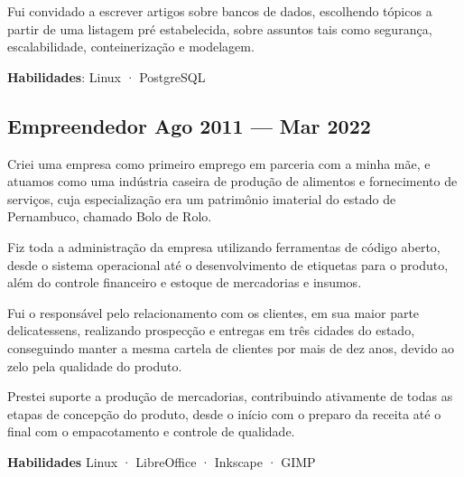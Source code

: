 \begin{zitemize}
  \item
    Fui convidado a escrever artigos sobre bancos de dados, escolhendo tópicos
    a partir de uma listagem pré estabelecida, sobre assuntos tais como
    segurança, escalabilidade, conteinerização e modelagem.
\end{zitemize}

\textbf{Habilidades}: Linux · PostgreSQL

\vspace{1em}
\subsection{Empreendedor \hfill Ago 2011 --- Mar 2022}

\begin{zitemize}
  \item
    Criei uma empresa como primeiro emprego em parceria com a minha mãe, e
    atuamos como uma indústria caseira de produção de alimentos e fornecimento
    de serviços, cuja especialização era um patrimônio imaterial do estado de
    Pernambuco, chamado Bolo de Rolo.
  \item
    Fiz toda a administração da empresa utilizando ferramentas de código
    aberto, desde o sistema operacional até o desenvolvimento de etiquetas para
    o produto, além do controle financeiro e estoque de mercadorias e insumos.
  \item
    Fui o responsável pelo relacionamento com os clientes, em sua maior parte
    delicatessens, realizando prospecção e entregas em três cidades do estado,
    conseguindo manter a mesma cartela de clientes por mais de dez anos, devido
    ao zelo pela qualidade do produto.
  \item
    Prestei suporte a produção de mercadorias, contribuindo ativamente de todas
    as etapas de concepção do produto, desde o início com o preparo da receita
    até o final com o empacotamento e controle de qualidade.
\end{zitemize}

\textbf{Habilidades} Linux · LibreOffice · Inkscape · GIMP

\vspace{.5em}
